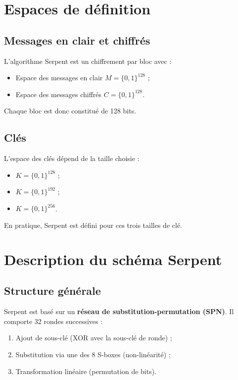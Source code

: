\documentclass[12pt,a4paper]{report}
\begin{document}
\tableofcontents

\section*{Espaces de définition}

\subsection{Messages en clair et chiffrés}
L’algorithme Serpent est un chiffrement par bloc avec :
\begin{itemize}
    \item Espace des messages en clair $M = \{0,1\}^{128}$ ;
    \item Espace des messages chiffrés $C = \{0,1\}^{128}$.
\end{itemize}
Chaque bloc est donc constitué de 128 bits.

\subsection{Clés}
L’espace des clés dépend de la taille choisie :
\begin{itemize}
    \item $K = \{0,1\}^{128}$ ;
    \item $K = \{0,1\}^{192}$ ;
    \item $K = \{0,1\}^{256}$.
\end{itemize}
En pratique, Serpent est défini pour ces trois tailles de clé.

\section*{Description du schéma Serpent}

\setcounter{subsection}{0}

\subsection{Structure générale}
Serpent est basé sur un \textbf{réseau de substitution-permutation (SPN)}.  
Il comporte 32 rondes successives :
\begin{enumerate}
    \item Ajout de sous-clé (XOR avec la sous-clé de ronde) ;
    \item Substitution via une des 8 S-boxes (non-linéarité) ;
    \item Transformation linéaire (permutation de bits).
\end{enumerate}
\end{document}
